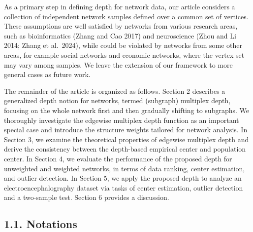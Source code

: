 \documentclass[
  10
]{article}
\begin{document}
As a primary step in defining depth for network data, our article
considers a collection of independent network samples defined over a
common set of vertices. These assumptions are well satisfied by networks
from various research areas, such as bioinformatics (Zhang and Cao 2017)
and neuroscience (Zhou and Li 2014; Zhang et al.~2024), while could be
violated by networks from some other areas, for example social networks
and economic networks, where the vertex set may vary among samples. We
leave the extension of our framework to more general cases as future
work.

The remainder of the article is organized as follows. Section 2
describes a generalized depth notion for networks, termed (subgraph)
multiplex depth, focusing on the whole network first and then gradually
shifting to subgraphs. We thoroughly investigate the edgewise multiplex
depth function as an important special case and introduce the structure
weights tailored for network analysis. In Section 3, we examine the
theoretical properties of edgewise multiplex depth and derive the
consistency between the depth-based empirical center and population
center. In Section 4, we evaluate the performance of the proposed depth
for unweighted and weighted networks, in terms of data ranking, center
estimation, and outlier detection. In Section 5, we apply the proposed
depth to analyze an electroencephalography dataset via tasks of center
estimation, outlier detection and a two-sample test. Section 6 provides
a discussion.

\subsection{1.1. Notations}\label{notations}
\end{document}
